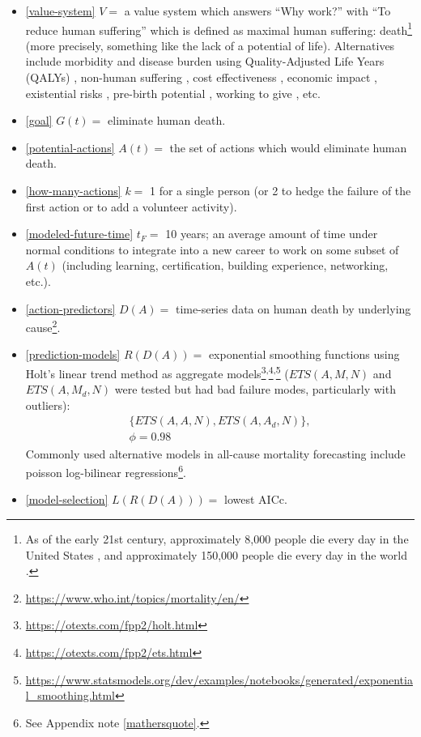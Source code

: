 \documentclass[10pt, a4paper, twocolumn]{IEEEconf}
\newcommand\footnotescontinue{\textsuperscript{,}}
\begin{document}
\begin{itemize}
  \item \eqref{value-system} $V = $ a value system which answers \enquote{Why work?} with \enquote{To reduce human suffering} which is defined as maximal human suffering: death\footnote{As of the early 21st century, approximately 8,000 people die every day in the United States \citep{kochanek2017deaths}, and approximately 150,000 people die every day in the world \citep{monasta2018global,bassat2018global}.} (more precisely, something like the lack of a potential of life).
  Alternatives include morbidity and disease burden using Quality-Adjusted Life Years (QALYs) \citep{weinstein2009qalys,lopez2006global,kyu2018global}, non-human suffering \citep{huemer2019dialogues}, cost effectiveness \citep{jamison2017disease,neumann2018comparing,givewellcosteffectiveness}, economic impact \citep{world2009guide}, existential risks \citep{bostrom2013existential}, pre-birth potential \citep{zane2015abortion}, working to give \citep{macaskill2015doing}, etc.
  \item \eqref{goal} $G(t) = $ eliminate human death.
  \item \eqref{potential-actions} $A(t) = $ the set of actions which would eliminate human death.
  \item \eqref{how-many-actions} $k = $ 1 for a single person (or 2 to hedge the failure of the first action or to add a volunteer activity).
  \item \eqref{modeled-future-time} $t_F = $ 10 years; an average amount of time under normal conditions to integrate into a new career to work on some subset of $A(t)$ (including learning, certification, building experience, networking, etc.).
  \item \eqref{action-predictors} $D(A) = $ time-series data on human death by underlying cause\footnote{\scriptsize{\url{https://www.who.int/topics/mortality/en/}}}.
  \item \eqref{prediction-models} $R(D(A)) = $ exponential smoothing functions using Holt's linear trend method as aggregate models\footnote{\scriptsize{\url{https://otexts.com/fpp2/holt.html}}}\footnotescontinue\footnote{\scriptsize{\url{https://otexts.com/fpp2/ets.html}}}\footnotescontinue\footnote{\scriptsize{\url{https://www.statsmodels.org/dev/examples/notebooks/generated/exponential_smoothing.html}}} ($ETS(A,M,N)$ and $ETS(A,M_d,N)$ were tested but had bad failure modes, particularly with outliers):
    \begin{equation*}
      \begin{gathered}
        \{ETS(A,A,N),ETS(A,A_d,N)\},\\
        \phi=0.98
      \end{gathered}
    \end{equation*}
    Commonly used alternative models in all-cause mortality forecasting include poisson log-bilinear regressions\footnote{See Appendix note \ref{mathersquote}.}.
  \item \eqref{model-selection} $L(R(D(A))) = $ lowest AICc.
\end{itemize}
\end{document}
